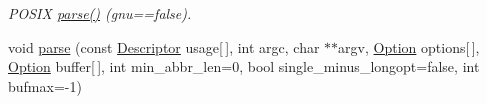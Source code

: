 \begin{DoxyCompactItemize}
\begin{DoxyCompactList}\small\item\em P\-O\-S\-I\-X \hyperlink{classxmem_1_1config_1_1third__party_1_1_parser_a0e45d97675bc5d003ef6f68ac8cd7249}{parse()} (gnu==false). \end{DoxyCompactList}\item 
\hypertarget{classxmem_1_1config_1_1third__party_1_1_parser_ac8d38fe3a923e2336ce610455aefb69b}{void \hyperlink{classxmem_1_1config_1_1third__party_1_1_parser_ac8d38fe3a923e2336ce610455aefb69b}{parse} (const \hyperlink{structxmem_1_1config_1_1third__party_1_1_descriptor}{Descriptor} usage\mbox{[}$\,$\mbox{]}, int argc, char $\ast$$\ast$argv, \hyperlink{classxmem_1_1config_1_1third__party_1_1_option}{Option} options\mbox{[}$\,$\mbox{]}, \hyperlink{classxmem_1_1config_1_1third__party_1_1_option}{Option} buffer\mbox{[}$\,$\mbox{]}, int min\-\_\-abbr\-\_\-len=0, bool single\-\_\-minus\-\_\-longopt=false, int bufmax=-\/1)}\label{classxmem_1_1config_1_1third__party_1_1_parser_ac8d38fe3a923e2336ce610455aefb69b}


\end{DoxyCompactItemize}

